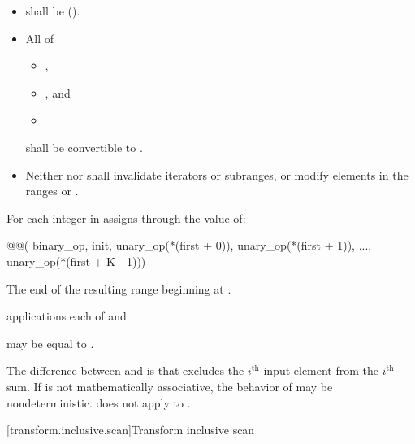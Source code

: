 \begin{itemdescr}
\pnum
\requires
\begin{itemize}
\item
   shall be  ().
\item
  All of
  \begin{itemize}
  \item {},
  \item {}, and
  \item {}
  \end{itemize}
  shall be convertible to .
\item
  Neither  nor  shall
  invalidate iterators or subranges, or modify elements in
  the ranges  or .
\end{itemize}

\pnum
\effects
For each integer  in 
assigns through  the value of:
\begin{codeblock}
@@(
    binary_op, init,
    unary_op(*(first + 0)), unary_op(*(first + 1)), ..., unary_op(*(first + K - 1)))
\end{codeblock}

\pnum
\returns
The end of the resulting range beginning at .

\pnum
\complexity
{} applications each
of  and .

\pnum
\remarks
{} may be equal to .

\pnum
\begin{note}
The difference between  and
 is that 
excludes the $i^\text{th}$ input element from the $i^\text{th}$ sum.
If  is not mathematically associative,
the behavior of  may be nondeterministic.
does not apply  to .
\end{note}
\end{itemdescr}

[transform.inclusive.scan]{Transform inclusive scan}

